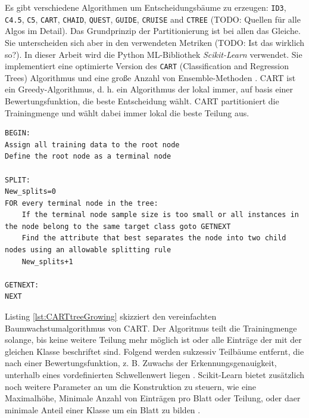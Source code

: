 \newline
\newline
Es gibt verschiedene Algorithmen um Entscheidungsbäume zu erzeugen: \texttt{ID3}, \texttt{C4.5}, \texttt{C5}, \texttt{CART}, \texttt{CHAID}, \texttt{QUEST},
\texttt{GUIDE}, \texttt{CRUISE} and \texttt{CTREE} \cite{singh2014comparative}(TODO: Quellen für alle Algos im Detail). Das Grundprinzip der Partitionierung ist bei allen das Gleiche.
Sie unterscheiden sich aber in den verwendeten Metriken (TODO: Ist das wirklich so?).
\newline
\newline
In dieser Arbeit wird die Python ML-Bibliothek \textit{Scikit-Learn} verwendet. Sie implementiert eine optimierte Version des \texttt{CART} (Classification and Regression Trees) Algorithmus \cite{ScikitLearnCART}
und eine große Anzahl von Ensemble-Methoden \cite{scikit-learn}.
\newline
\newline
CART ist ein Greedy-Algorithmus, d. h. ein Algorithmus der lokal immer, auf basis einer Bewertungsfunktion, die beste Entscheidung wählt.
CART partitioniert die Trainingmenge und wählt dabei immer lokal die beste Teilung aus.
\begin{lstlisting}[label=lst:CARTtreeGrowing,caption={Skizze von vereinfachten Baumwachstumsalgorithmus \cite{steinbergCART}.}]
BEGIN:
Assign all training data to the root node
Define the root node as a terminal node

SPLIT:
New_splits=0
FOR every terminal node in the tree:
    If the terminal node sample size is too small or all instances in the node belong to the same target class goto GETNEXT
    Find the attribute that best separates the node into two child nodes using an allowable splitting rule
    New_splits+1

GETNEXT:
NEXT
\end{lstlisting}
Listing \ref{lst:CARTtreeGrowing} skizziert den vereinfachten Baumwachstumalgorithmus von CART. Der Algoritmus teilt die Trainingmenge solange, bis keine weitere Teilung mehr möglich ist oder alle Einträge der
mit der gleichen Klasse beschriftet sind. Folgend werden sukzessiv Teilbäume entfernt, die nach einer Bewertungsfunktion, z. B. Zuwachs der Erkennungsgenauigkeit, unterhalb eines vordefinierten
Schwellenwert liegen \cite{steinbergCART}.
\newline
\newline
Scikit-Learn bietet zusätzlich noch weitere Parameter an um die Konstruktion zu steuern, wie eine Maximalhöhe, Minimale Anzahl von Einträgen pro Blatt oder Teilung, oder daer minimale Anteil einer Klasse
um ein Blatt zu bilden \cite{ScikitLearnDTC}.